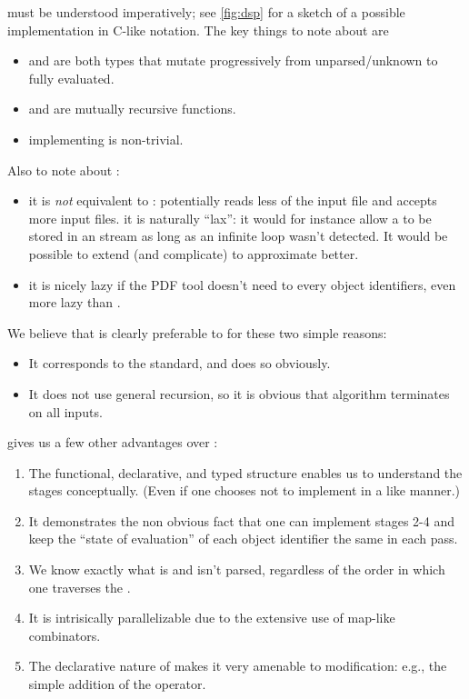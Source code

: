 \dsp must be understood imperatively; see \cref{fig:dsp} for a sketch
of a possible implementation in C-like notation.
The key things to note about \dsp{} are
\begin{itemize}
\item {} and  are both types that mutate progressively
   from unparsed/unknown to fully evaluated.
\item {} and  are mutually recursive functions.
\item implementing  is non-trivial.
\end{itemize}
Also to note about \dsp{}:
\begin{itemize}
\item it is \emph{not} equivalent to \ssp{}: \dsp{} potentially reads
  less of the input file and accepts more input files.  it is
  naturally ``lax'': it would for instance allow a  to
  be stored in an  stream as long as an infinite loop
  wasn't detected.  It would be possible to extend (and complicate) \dsp{}
  to approximate \ssp{} better.
\item it is nicely lazy if the PDF tool doesn't need to 
  every object identifiers, even more lazy than \ssp{}.
\end{itemize}

We believe that \ssp{} is clearly preferable to \dsp{} for these two
simple reasons:
\begin{itemize}
\item It corresponds to the standard, and does so obviously.
\item It does not use general recursion, so it is obvious that \ssp{}
  algorithm terminates on all inputs.
\end{itemize}
\ssp{} gives us a few other advantages over \dsp{}:
\begin{enumerate}
\item The functional, declarative, and typed structure enables
  us to understand the stages conceptually.  (Even if one chooses
  not to implement in a like manner.)
\item It demonstrates the non obvious fact that one can
  implement stages 2-4 and keep the ``state of evaluation'' of each
  object identifier the same in each pass.
\item We know exactly what is and isn't parsed, regardless of the
  order in which one traverses the .
\item It is intrisically parallelizable due to the extensive use of
  map-like combinators.
\item The declarative nature of \ssp{} makes it very amenable to
  modification: e.g., the simple addition of the 
  operator.
\end{enumerate}


